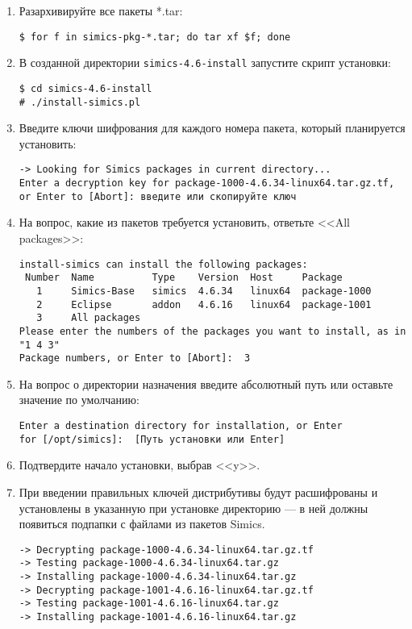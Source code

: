 \begin{enumerate}
\item Разархивируйте все пакеты *.tar:
\begin{lstlisting}
$ for f in simics-pkg-*.tar; do tar xf $f; done
\end{lstlisting}
\item В созданной директории \texttt{simics-4.6-install} запустите скрипт установки:
\begin{lstlisting}
$ cd simics-4.6-install
# ./install-simics.pl
\end{lstlisting} 
    
\item Введите ключи шифрования для каждого номера пакета, который планируется установить:
\begin{lstlisting}
-> Looking for Simics packages in current directory...
Enter a decryption key for package-1000-4.6.34-linux64.tar.gz.tf,
or Enter to [Abort]: введите или скопируйте ключ
\end{lstlisting} 

\item На вопрос, какие из пакетов требуется установить, ответьте <<All packages>>:
\begin{lstlisting}
install-simics can install the following packages:
 Number  Name          Type    Version  Host     Package
   1     Simics-Base   simics  4.6.34   linux64  package-1000
   2     Eclipse       addon   4.6.16   linux64  package-1001
   3     All packages
Please enter the numbers of the packages you want to install, as in "1 4 3"
Package numbers, or Enter to [Abort]:  3
\end{lstlisting}
    
\item На вопрос о директории назначения введите абсолютный путь или оставьте значение по умолчанию:
\begin{lstlisting}
Enter a destination directory for installation, or Enter
for [/opt/simics]:  [Путь установки или Enter]
\end{lstlisting}

\item Подтвердите начало установки, выбрав <<y>>.

\item При введении правильных ключей дистрибутивы будут расшифрованы и установлены в указанную при установке директорию --- в ней должны появиться подпапки с файлами из пакетов Simics.
\begin{lstlisting}
-> Decrypting package-1000-4.6.34-linux64.tar.gz.tf
-> Testing package-1000-4.6.34-linux64.tar.gz
-> Installing package-1000-4.6.34-linux64.tar.gz
-> Decrypting package-1001-4.6.16-linux64.tar.gz.tf
-> Testing package-1001-4.6.16-linux64.tar.gz
-> Installing package-1001-4.6.16-linux64.tar.gz


\end{lstlisting}
\end{enumerate}
